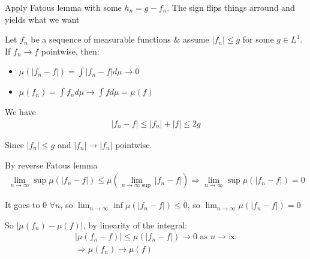 \par\bigskip
\begin{prf}[]{}
  Apply Fatous lemma with some $h_n = g-f_n$. The sign flips things arround and yields what we want
\end{prf}
\par\bigskip
\begin{theo}{}
  Let $f_n$ be a sequence of measurable functions $\&$ assume $\left|f_n\right|\leq g$ for some $g\in L^1$. If $f_n\to f$ pointwise, then:\par
  \begin{itemize}
    \item $\mu(\left|f_n-f\right|) = \int \left|f_n-f\right|d\mu\to0$
    \item $\mu(f_n) = \int f_n d\mu\to\int f d\mu = \mu(f)$
  \end{itemize}
\end{theo}
\par\bigskip
\begin{prf}{}
  We have
  \begin{equation*}
    \begin{gathered}
      \left|f_n-f\right|\leq \left|f_n\right|+\left|f\right|\leq 2g
    \end{gathered}
  \end{equation*}\par
  \noindent Since $\left|f_n\right|\leq g$ and $\left|f_n\right|\to \left|f_n\right|$ pointwise.\par
  \noindent By reverse Fatous lemma
  \begin{equation*}
    \begin{gathered}
      \lim_{n\to\infty}\sup\mu\left(\left|f_n-f\right|\right)\leq\mu\left(\lim_{n\to\infty\sup}\left|f_n-f\right|\right)\Rightarrow \lim_{n\to\infty}\sup\mu\left(\left|f_n-f\right|\right)=0
    \end{gathered}
  \end{equation*}
  \par\bigskip
  \noindent It goes to 0 $\forall n$, so $\lim_{n\to\infty}\inf\mu\left(\left|f_n-f\right|\right)\leq0$, so $\lim_{n\to\infty}\mu\left(\left|f_n-f\right|\right)=0$\par
  \noindent So $\left|\mu(f_n)-\mu(f)\right|$, by linearity of the integral:
  \begin{equation*}
    \begin{gathered}
      \left|\mu(f_n-f)\right|\leq\mu\left(\left|f_n-f\right|\right)\to0\text{ as } n\to\infty\\
      \Rightarrow \mu(f_n)\to\mu(f)
    \end{gathered}
  \end{equation*}
\end{prf}
